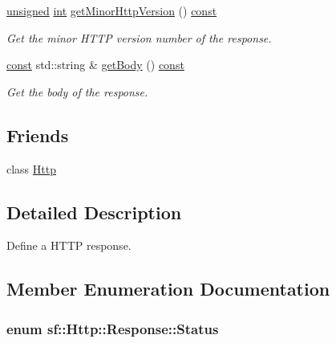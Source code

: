 \begin{DoxyCompactItemize}
\hyperlink{curses_8priv_8h_aca40206900cfc164654362fa8d4ad1e6}{unsigned} \hyperlink{term__entry_8h_ad65b480f8c8270356b45a9890f6499ae}{int} \hyperlink{classsf_1_1_http_1_1_response_a1c2217a6a848695875380a70d060b239}{get\-Minor\-Http\-Version} () \hyperlink{term__entry_8h_a57bd63ce7f9a353488880e3de6692d5a}{const} 
\begin{DoxyCompactList}\small\item\em Get the minor H\-T\-T\-P version number of the response. \end{DoxyCompactList}\item 
\hyperlink{term__entry_8h_a57bd63ce7f9a353488880e3de6692d5a}{const} std\-::string \& \hyperlink{classsf_1_1_http_1_1_response_a6b74ef73051a16ebb20041495c758e22}{get\-Body} () \hyperlink{term__entry_8h_a57bd63ce7f9a353488880e3de6692d5a}{const} 
\begin{DoxyCompactList}\small\item\em Get the body of the response. \end{DoxyCompactList}\end{DoxyCompactItemize}
\subsection*{Friends}
\begin{DoxyCompactItemize}
\item 
class \hyperlink{classsf_1_1_http_1_1_response_ad44371f4a337a0f6537733cdf6df8e76}{Http}
\end{DoxyCompactItemize}


\subsection{Detailed Description}
Define a H\-T\-T\-P response. 

\subsection{Member Enumeration Documentation}
\hypertarget{classsf_1_1_http_1_1_response_a663e071978e30fbbeb20ed045be874d8}{
\subsubsection[{Status}]{\setlength{\rightskip}{0pt plus 5cm}enum {\bf sf\-::\-Http\-::\-Response\-::\-Status}}}\label{classsf_1_1_http_1_1_response_a663e071978e30fbbeb20ed045be874d8}


